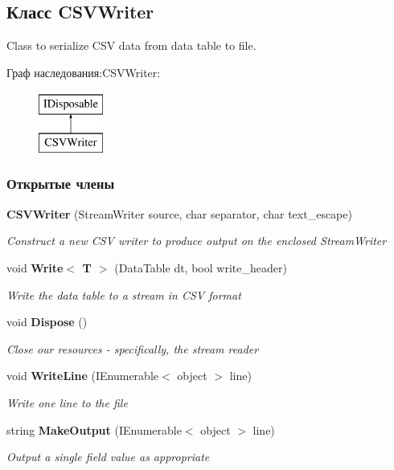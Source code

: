 \subsection{Класс C\+S\+V\+Writer}
\label{classkdz__manager_1_1_c_s_v_writer}


Class to serialize C\+S\+V data from data table to file.  


Граф наследования\+:C\+S\+V\+Writer\+:\begin{figure}[H]
\begin{center}
\leavevmode
\includegraphics[height=2.000000cm]{classkdz__manager_1_1_c_s_v_writer}
\end{center}
\end{figure}
\subsubsection*{Открытые члены}
\begin{DoxyCompactItemize}
\item 
{\bf C\+S\+V\+Writer} (Stream\+Writer source, char separator, char text\+\_\+escape)
\begin{DoxyCompactList}\small\item\em Construct a new C\+S\+V writer to produce output on the enclosed Stream\+Writer \end{DoxyCompactList}\item 
void {\bf Write$<$ T $>$} (Data\+Table dt, bool write\+\_\+header)
\begin{DoxyCompactList}\small\item\em Write the data table to a stream in C\+S\+V format \end{DoxyCompactList}\item 
void {\bf Dispose} ()
\begin{DoxyCompactList}\small\item\em Close our resources -\/ specifically, the stream reader \end{DoxyCompactList}\item 
void {\bf Write\+Line} (I\+Enumerable$<$ object $>$ line)
\begin{DoxyCompactList}\small\item\em Write one line to the file \end{DoxyCompactList}\item 
string {\bf Make\+Output} (I\+Enumerable$<$ object $>$ line)
\begin{DoxyCompactList}\small\item\em Output a single field value as appropriate \end{DoxyCompactList}\end{DoxyCompactItemize}
